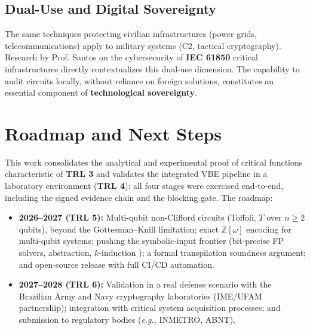 \documentclass[journal]{IEEEtran} %
\begin{document}
\subsection{Dual-Use and Digital Sovereignty}
The same techniques protecting civilian infrastructures (power grids, telecommunications) apply to military systems (C2, tactical cryptography). Research by Prof. Santos on the cybersecurity of \textbf{IEC 61850} critical infrastructures \cite{ref25} directly contextualizes this dual-use dimension. The capability to audit circuits locally, without reliance on foreign solutions, constitutes an essential component of \textbf{technological sovereignty}.

\section{Roadmap and Next Steps}
\label{sec:roadmap}
This work consolidates the analytical and experimental proof of critical functions characteristic of \textbf{TRL 3} and validates the integrated VBE pipeline in a laboratory environment (\textbf{TRL 4}): all four stages were exercised end-to-end, including the signed evidence chain and the blocking gate. The roadmap:

\begin{itemize}
    \item \textbf{2026--2027 (TRL 5):} Multi-qubit non-Clifford circuits (Toffoli, $T$ over $n \geq 2$ qubits), beyond the Gottesman--Knill limitation; exact $\mathbb{Z}[\omega]$ encoding for multi-qubit systems; pushing the symbolic-input frontier (bit-precise FP solvers, abstraction, $k$-induction \cite{ref8}); a formal transpilation soundness argument; and open-source release with full CI/CD automation.
    \item \textbf{2027--2028 (TRL 6):} Validation in a real defense scenario with the Brazilian Army and Navy cryptography laboratories (IME/UFAM partnership); integration with critical system acquisition processes; and submission to regulatory bodies (\textit{e.g.}, INMETRO, ABNT).
\end{itemize}
\end{document}
